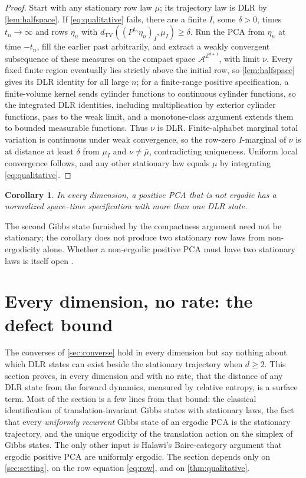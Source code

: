 \documentclass[11pt]{article}
\theoremstyle{plain}
\newtheorem{corollary}[theorem]{Corollary}
\theoremstyle{definition}
\theoremstyle{remark}
\newcommand{\A}{\mathcal{A}}
\newcommand{\Z}{\mathbb{Z}}
\newcommand{\dtv}{d_{\mathrm{TV}}}
\newcommand{\ba}{\bar{\mu}}
\begin{document}
\begin{proof}
Start with any stationary row law $\mu$; its trajectory law is DLR by \cref{lem:halfspace}. If \eqref{eq:qualitative} fails, there are a finite $I$, some $\delta>0$, times $t_n\to\infty$ and rows $\eta_n$ with $\dtv((P^{t_n}\eta_n)_I,\mu_I)\ge\delta$. Run the PCA from $\eta_n$ at time $-t_n$, fill the earlier past arbitrarily, and extract a weakly convergent subsequence of these measures on the compact space $\A^{\Z^{d+1}}$, with limit $\nu$. Every fixed finite region eventually lies strictly above the initial row, so \cref{lem:halfspace} gives its DLR identity for all large $n$; for a finite-range positive specification, a finite-volume kernel sends cylinder functions to continuous cylinder functions, so the integrated DLR identities, including multiplication by exterior cylinder functions, pass to the weak limit, and a monotone-class argument extends them to bounded measurable functions. Thus $\nu$ is DLR. Finite-alphabet marginal total variation is continuous under weak convergence, so the row-zero $I$-marginal of $\nu$ is at distance at least $\delta$ from $\mu_I$ and $\nu\neq\ba$, contradicting uniqueness. Uniform local convergence follows, and any other stationary law equals $\mu$ by integrating \eqref{eq:qualitative}.
\end{proof}

\begin{corollary}
\label{cor:nonerg}
In every dimension, a positive PCA that is not ergodic has a normalized space--time specification with more than one DLR state.
\end{corollary}

The second Gibbs state furnished by the compactness argument need not be stationary; the corollary does not produce two stationary row laws from non-ergodicity alone. Whether a non-ergodic positive PCA must have two stationary laws is itself open \cite{CM11}.

\section{Every dimension, no rate: the defect bound}
\label{sec:defect}

The converses of \cref{sec:converse} hold in every dimension but say nothing about which DLR states can exist beside the stationary trajectory when $d\ge2$. This section proves, in every dimension and with no rate, that the distance of any DLR state from the forward dynamics, measured by relative entropy, is a surface term. Most of the section is a few lines from that bound: the classical identification of translation-invariant Gibbs states with stationary laws, the fact that every \emph{uniformly recurrent} Gibbs state of an ergodic PCA is the stationary trajectory, and the unique ergodicity of the translation action on the simplex of Gibbs states. The only other input is Halawi's Baire-category argument that ergodic positive PCA are uniformly ergodic. The section depends only on \cref{sec:setting}, on the row equation \eqref{eq:row}, and on \cref{thm:qualitative}.
\end{document}
